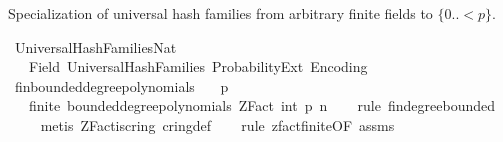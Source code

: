 %
\begin{isabellebody}%
%
%
\isadelimdocument
%
\endisadelimdocument
%
\isatagdocument
%
\isamarkuptrue%
%
\endisatagdocument
{\isafolddocument}%
%
\isadelimdocument
%
\endisadelimdocument
%
\begin{isamarkuptext}%
Specialization of universal hash families from arbitrary finite 
  fields to $\{0..<p\}$.%
\end{isamarkuptext}\isamarkuptrue%
%
\isadelimtheory
%
\endisadelimtheory
%
\isatagtheory
{}\isamarkupfalse%
\ Universal{\isacharunderscore}{\kern0pt}Hash{\isacharunderscore}{\kern0pt}Families{\isacharunderscore}{\kern0pt}Nat\isanewline
\ \ \ Field\ Universal{\isacharunderscore}{\kern0pt}Hash{\isacharunderscore}{\kern0pt}Families\ Probability{\isacharunderscore}{\kern0pt}Ext\ Encoding\isanewline
{}%
\endisatagtheory
{\isafoldtheory}%
%
\isadelimtheory
%
\endisadelimtheory
\isanewline
\isanewline
{}\isamarkupfalse%
\ fin{\isacharunderscore}{\kern0pt}bounded{\isacharunderscore}{\kern0pt}degree{\isacharunderscore}{\kern0pt}polynomials{\isacharcolon}{\kern0pt}\isanewline
\ \ \ {\isachardoublequoteopen}p\ {\isachargreater}{\kern0pt}\ {}{\isachardoublequoteclose}\isanewline
\ \ \ {\isachardoublequoteopen}finite\ {\isacharparenleft}{\kern0pt}bounded{\isacharunderscore}{\kern0pt}degree{\isacharunderscore}{\kern0pt}polynomials\ {\isacharparenleft}{\kern0pt}ZFact\ {\isacharparenleft}{\kern0pt}int\ p{\isacharparenright}{\kern0pt}{\isacharparenright}{\kern0pt}\ n{\isacharparenright}{\kern0pt}{\isachardoublequoteclose}\isanewline
%
\isadelimproof
\ \ %
\endisadelimproof
%
\isatagproof
{}\isamarkupfalse%
\ {\isacharparenleft}{\kern0pt}rule\ fin{\isacharunderscore}{\kern0pt}degree{\isacharunderscore}{\kern0pt}bounded{\isacharparenright}{\kern0pt}\isanewline
\ \ \ \isamarkupfalse%
\ {\isacharparenleft}{\kern0pt}metis\ ZFact{\isacharunderscore}{\kern0pt}is{\isacharunderscore}{\kern0pt}cring\ cring{\isacharunderscore}{\kern0pt}def{\isacharparenright}{\kern0pt}\isanewline
\ \ \isamarkupfalse%
\ {\isacharparenleft}{\kern0pt}rule\ zfact{\isacharunderscore}{\kern0pt}finite{\isacharbrackleft}{\kern0pt}OF\ assms{\isacharbrackright}{\kern0pt}{\isacharparenright}{\kern0pt}%
\endisatagproof
{\isafoldproof}%
%

\end{isabellebody}
